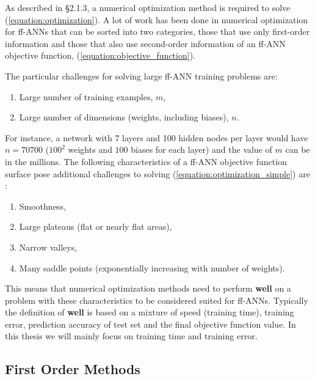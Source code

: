 \documentclass[letterpaper,12pt,titlepage,oneside,final]{book}
\begin{document}
	As described in \S{2.1.3}, a numerical optimization method is required to solve (\ref{equation:optimization}). A lot of work has been done in numerical optimization for ff-ANNs that can be sorted into two categories, those that use only first-order information and those that also use second-order information of an ff-ANN objective function, (\ref{equation:objective_function}). 
	
	The particular challenges for solving large ff-ANN training problems are:
	\begin{enumerate}
		\item {Large number of training examples, $m$,}
		\item {Large number of dimensions (weights, including biases), $n$. }
	\end{enumerate}
	For instance, a network with 7 layers and 100 hidden nodes per layer would have $n=70700$ ($100^{2}$ weights and $100$ biases for each layer) and the value of $m$ can be in the millions. The following characteristics of a ff-ANN objective function surface pose additional challenges to solving (\ref{equation:optimization_simple}) are \cite{Shepherd.1997}:
	\begin{enumerate}
		\item {Smoothness,}
		\item {Large plateaus (flat or nearly flat areas),}
		\item {Narrow valleys,}
		\item {Many saddle points (exponentially increasing with number of weights).}
	\end{enumerate}
	This means that numerical optimization methods need to perform \textbf{well} on a problem with these characteristics to be considered suited for ff-ANNs. Typically the definition of \textbf{well} is based on a mixture of speed (training time), training error, prediction accuracy of test set and the final objective function value. In this thesis we will mainly focus on training time and training error.
	
	\subsection{First Order Methods}
	
\end{document}
